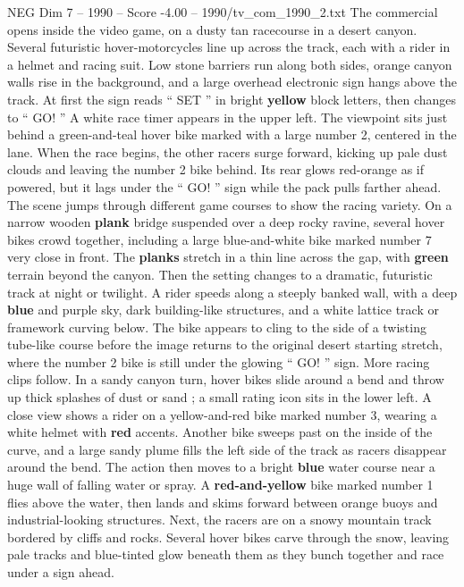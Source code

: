 \begin{textsample}{NEG Dim 7 – 1990 – Score -4.00 – 1990/tv\_com\_1990\_2.txt}  \label{ex:f7_neg_039}
The commercial opens inside the video game, on a dusty tan racecourse in a desert canyon.
Several futuristic hover-motorcycles line up across the track, each with a rider in a helmet and racing suit.
Low stone barriers run along both sides, orange canyon walls rise in the background, and a large overhead electronic sign hangs above the track.
At first the sign reads “ SET ” in bright \textbf{yellow} block letters, then changes to “ GO! ” A white race timer appears in the upper left.
The viewpoint sits just behind a green-and-teal hover bike marked with a large number 2, centered in the lane.
When the race begins, the other racers surge forward, kicking up pale dust clouds and leaving the number 2 bike behind.
Its rear glows red-orange as if powered, but it lags under the “ GO! ” sign while the pack pulls farther ahead.
The scene jumps through different game courses to show the racing variety.
On a narrow wooden \textbf{plank} bridge suspended over a deep rocky ravine, several hover bikes crowd together, including a large blue-and-white bike marked number 7 very close in front.
The \textbf{planks} stretch in a thin line across the gap, with \textbf{green} terrain beyond the canyon.
Then the setting changes to a dramatic, futuristic track at night or twilight.
A rider speeds along a steeply banked wall, with a deep \textbf{blue} and purple sky, dark building-like structures, and a white lattice track or framework curving below.
The bike appears to cling to the side of a twisting tube-like course before the image returns to the original desert starting stretch, where the number 2 bike is still under the glowing “ GO! ” sign.
More racing clips follow.
In a sandy canyon turn, hover bikes slide around a bend and throw up thick splashes of dust or sand ; a small rating icon sits in the lower left.
A close view shows a rider on a yellow-and-red bike marked number 3, wearing a white helmet with \textbf{red} accents.
Another bike sweeps past on the inside of the curve, and a large sandy plume fills the left side of the track as racers disappear around the bend.
The action then moves to a bright \textbf{blue} water course near a huge wall of falling water or spray.
A \textbf{red-and-yellow} bike marked number 1 flies above the water, then lands and skims forward between orange buoys and industrial-looking structures.
Next, the racers are on a snowy mountain track bordered by cliffs and rocks.
Several hover bikes carve through the snow, leaving pale tracks and blue-tinted glow beneath them as they bunch together and race under a sign ahead.

\end{textsample}
